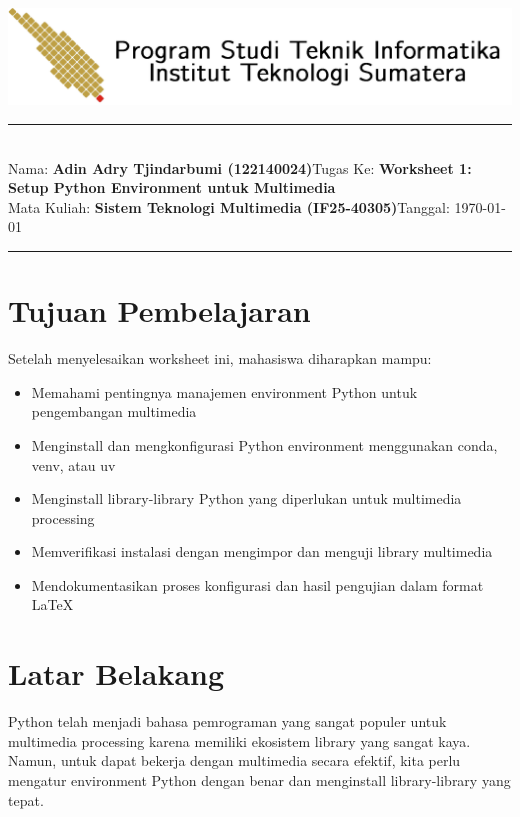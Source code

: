\documentclass[11pt,a4paper]{article}
\newcommand{\student}{\textbf{Adin Adry Tjindarbumi (122140024)}}
\newcommand{\course}{\textbf{Sistem Teknologi Multimedia (IF25-40305)}}
\newcommand{\assignment}{\textbf{Worksheet 1: Setup Python Environment untuk Multimedia}}
\begin{document}
\thispagestyle{empty}
\begin{center}
	\includegraphics[scale = 0.15]{Figure/ifitera-header.png}
	\vspace{0.1cm}
\end{center}
\noindent
\rule{17cm}{0.2cm}\\[0.3cm]
Nama: \student \hfill Tugas Ke: \assignment\\[0.1cm]
Mata Kuliah: \course \hfill Tanggal: \today\\
\rule{17cm}{0.05cm}
\vspace{0.1cm}



\section{Tujuan Pembelajaran}
Setelah menyelesaikan worksheet ini, mahasiswa diharapkan mampu:
\begin{itemize}
    \item Memahami pentingnya manajemen environment Python untuk pengembangan multimedia
    \item Menginstall dan mengkonfigurasi Python environment menggunakan conda, venv, atau uv
    \item Menginstall library-library Python yang diperlukan untuk multimedia processing
    \item Memverifikasi instalasi dengan mengimpor dan menguji library multimedia
    \item Mendokumentasikan proses konfigurasi dan hasil pengujian dalam format \LaTeX
\end{itemize}

\section{Latar Belakang}
Python telah menjadi bahasa pemrograman yang sangat populer untuk multimedia processing karena memiliki ekosistem library yang sangat kaya. Namun, untuk dapat bekerja dengan multimedia secara efektif, kita perlu mengatur environment Python dengan benar dan menginstall library-library yang tepat.
\end{document}
